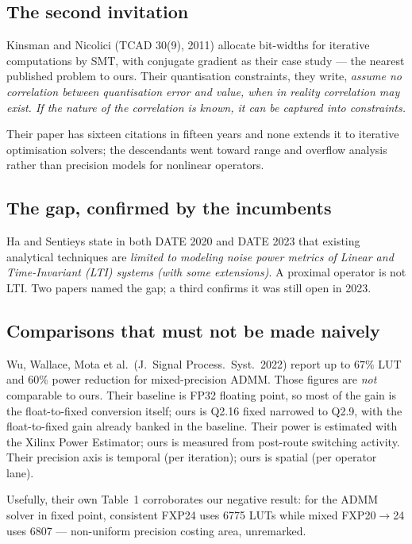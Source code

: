 \documentclass[11pt,a4paper]{article}
\begin{document}
\subsection{The second invitation}

Kinsman and Nicolici (TCAD 30(9), 2011) allocate bit-widths for iterative
computations by SMT, with conjugate gradient as their case study --- the
nearest published problem to ours. Their quantisation constraints, they write,
\emph{assume no correlation between quantisation error and value, when in
reality correlation may exist. If the nature of the correlation is known, it
can be captured into constraints.}

Their paper has sixteen citations in fifteen years and none extends it to
iterative optimisation solvers; the descendants went toward range and overflow
analysis rather than precision models for nonlinear operators.

\subsection{The gap, confirmed by the incumbents}

Ha and Sentieys state in both DATE 2020 and DATE 2023 that existing analytical
techniques are \emph{limited to modeling noise power metrics of Linear and
Time-Invariant (LTI) systems (with some extensions)}. A proximal operator is
not LTI. Two papers named the gap; a third confirms it was still open in 2023.

\subsection{Comparisons that must not be made naively}

Wu, Wallace, Mota et al.\ (J.\ Signal Process.\ Syst.\ 2022) report up to
$67\%$ LUT and $60\%$ power reduction for mixed-precision ADMM. Those figures
are \emph{not} comparable to ours. Their baseline is FP32 floating point, so
most of the gain is the float-to-fixed conversion itself; ours is Q2.16 fixed
narrowed to Q2.9, with the float-to-fixed gain already banked in the baseline.
Their power is estimated with the Xilinx Power Estimator; ours is measured from
post-route switching activity. Their precision axis is temporal (per iteration);
ours is spatial (per operator lane).

Usefully, their own Table~1 corroborates our negative result: for the ADMM
solver in fixed point, consistent FXP24 uses 6775 LUTs while mixed FXP20$\to$24
uses 6807 --- non-uniform precision costing area, unremarked.
\end{document}

